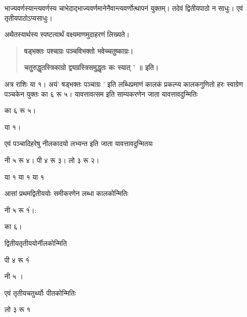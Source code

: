 \documentclass[11pt, openany]{book}
\begin{document}
\begin{sloppypar}
\hangindent=0.2in भाज्यवर्णस्यान्त्यवर्णस्य चाभेदाद्भाज्यवर्णमानेनैवान्त्यवर्णोत्थापनं युक्तम्। तदेवं द्वितीयपाठो न साधुः। एवं तृतीयपाठोऽप्यसाधुः। 

\hangindent=0.2in \hspace{0.2in}अथैतस्यार्थस्य स्पष्टत्वार्थं वक्ष्यमाणमुदाहरणं लिख्यते।

\begin{quote}
\hspace{1in}\textbf{षड्भक्तः पश्चाग्रः पञ्चविभक्तो भवेच्चतुष्काग्रः।}

\hspace{1in}\textbf{चतुरुद्धृतस्त्रिकाग्रो द्व्यग्रस्त्रिसमुद्धृतः कः स्यात् ' ॥ इति।}
\end{quote}

\hangindent=0.2in \hspace{0.2in}अत्र राशिः या १। अयं' षड्भक्तः पञ्चाग्रः ' इति लब्धिप्रमाणं कालकं प्रकल्प्य कालकगुणितो हरः स्वाग्रेण पञ्चकेन युक्तः का ६ रू ५। यावत्तावत्सम इति साम्यकरणेन जाता यावत्तावदुन्मितिः
\begin{center}
का ६ रू ५।

\hspace{0.5in}या १।
\end{center}

\hangindent=0.2in एवं पञ्चादिहरेषु नीलकादयो लभ्यन्त इति जाता यावत्तावदुन्मितयः

\hspace{1in}नी ५ रू ४।\hspace{0.5in} पी ४ रू ३।\hspace{0.5in} लो ३ रू २।

\hspace{1.4in}या १\hspace{1in} या १\hspace{1in} या १

\hangindent=0.2in आसां प्रथमद्वितीययोः समीकरणेन लब्धा कालकोन्मितिः
\begin{center}
नी ५ रू १ं।:

\hspace{0.5in}का ६।
\end{center}

\hangindent=0.2in द्वितीयतृतीययोर्नीलकोन्मिति 
\begin{center}
पी ४ रू १ं

\hspace{0.5in}नी ५ ।
\end{center}

\hangindent=0.2in एवं तृतीयचतुर्थ्योः पीतकोन्मितिः
\begin{center}
लो ३ रू १


\end{center}
\end{sloppypar}
\end{document}
